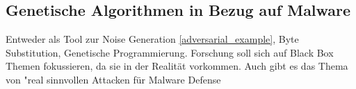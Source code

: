\subsection{Genetische Algorithmen in Bezug auf Malware}

Entweder als Tool zur Noise Generation \ref{adversarial_example}, Byte Substitution, Genetische Programmierung. Forschung soll sich auf Black Box Themen fokussieren, da sie in der Realität vorkommen. Auch gibt es das Thema von "real sinnvollen Attacken für Malware Defense 